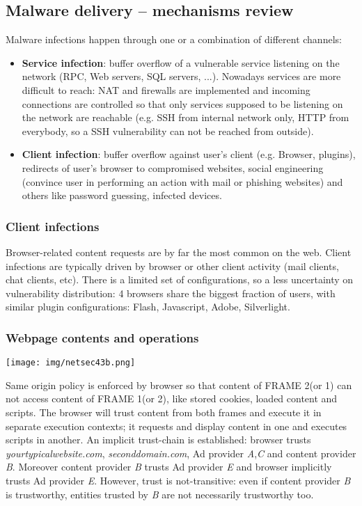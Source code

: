 \documentclass[a4paper, 10pt, titlepage]{article}
\begin{document}
\subsection{Malware delivery – mechanisms review}
Malware infections happen through one or a combination of different channels:
\begin{itemize}
	\item \textbf{Service infection}: buffer overflow of a vulnerable service listening on the network (RPC, Web servers, SQL servers, ...). Nowadays services are more difficult to reach: NAT and firewalls are implemented and incoming connections are controlled so that only services supposed to be listening on the network are reachable (e.g. SSH from internal network only, HTTP from everybody, so a SSH vulnerability can not be reached from outside).
	\item \textbf{Client infection}: buffer overflow against user’s client (e.g. Browser, plugins), redirects of user’s browser to compromised websites, social engineering (convince user in performing an action with mail or phishing websites) and others like password guessing, infected devices.
\end{itemize}

\subsubsection*{Client infections}
Browser-related content requests are by far the most common on the web. Client infections are typically driven by browser or other client activity (mail clients, chat clients, etc).
There is a limited set of configurations, so a less uncertainty on vulnerability distribution: 4 browsers share the biggest fraction of users, with similar plugin configurations: Flash, Javascript, Adobe, Silverlight.

\subsubsection*{Webpage contents and operations}
\begin{center}
	\texttt{[image: img/netsec43b.png]}
\end{center}
Same origin policy is enforced by browser so that content of FRAME 2(or 1) can not access content of FRAME 1(or 2), like stored cookies, loaded content and scripts. The browser will trust content from both frames and execute it in separate execution contexts; it requests and display content in one and executes scripts in another.
An implicit trust-chain is established: browser trusts \textit{yourtypicalwebsite.com}, \textit{seconddomain.com}, Ad provider \textit{A},\textit{C} and content provider \textit{B}. Moreover content provider \textit{B} trusts Ad provider \textit{E} and browser implicitly trusts Ad provider \textit{E}.
However, trust is not-transitive: even if content provider \textit{B} is trustworthy, entities trusted by \textit{B} are not necessarily trustworthy too.
\end{document}
